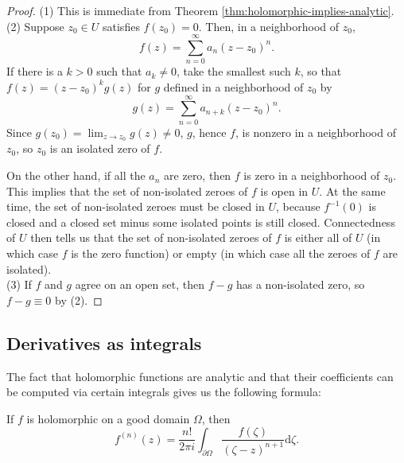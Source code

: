 \documentclass[10pt]{article}
\providecommand{\dd}{\mathrm d}
\providecommand{\inv}{^{-1}}
\begin{document}
\begin{proof}
    (1) This is immediate from Theorem \ref{thm:holomorphic-implies-analytic}.
    \\

    (2) Suppose $z_0\in U$ satisfies $f(z_0) = 0$.
    Then, in a neighborhood of $z_0$,
    \begin{equation*}
	f(z) = \sum_{n=0}^\infty a_n(z-z_0)^n.
    \end{equation*}
    If there is a $k>0$ such that $a_k \ne 0$,
    take the smallest such $k$, so that
    $f(z) = (z-z_0)^k g(z)$ for $g$ defined in a neighborhood of $z_0$ by
    \begin{equation*}
	g(z) = \sum_{n=0}^\infty a_{n+k}(z-z_0)^n.
    \end{equation*}
    Since $g(z_0) = \lim_{z\to z_0}g(z) \ne 0$,
    $g$, hence $f$, is nonzero in a neighborhood of $z_0$,
    so $z_0$ is an isolated zero of $f$.

    On the other hand, if all the $a_n$ are zero,
    then $f$ is zero in a neighborhood of $z_0$.
    This implies that the set of non-isolated zeroes of $f$
    is open in $U$. At the same time, the set of non-isolated zeroes
    must be closed in $U$, because $f\inv(0)$ is closed
    and a closed set minus some isolated points is still closed.
    Connectedness of $U$ then tells us that
    the set of non-isolated zeroes of $f$ is either
    all of $U$ (in which case $f$ is the zero function)
    or empty (in which case all the zeroes of $f$ are isolated).
    \\

    (3) If $f$ and $g$ agree on an open set, then
    $f-g$ has a non-isolated zero, so $f-g\equiv 0$ by (2).
\end{proof}

\pagebreak
\subsection{Derivatives as integrals}
The fact that holomorphic functions are analytic
and that their coefficients can be computed
via certain integrals gives us the following formula:

\begin{corollary}
    \label{coro:nth-derivative-integral}
    If $f$ is holomorphic on a good domain $\Omega$, then
    \begin{equation*}
	f^{(n)}(z) = \frac{n!}{2\pi i}\int_{\partial\Omega}
	\frac{f(\zeta)}{(\zeta-z)^{n+1}}\dd\zeta.
    \end{equation*}
\end{corollary}
\end{document}
